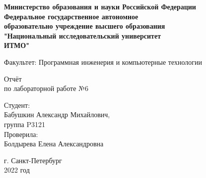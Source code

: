 \begin{titlepage}
    \newpage
    \begin{center}
    {\bfseries \large Министерство образования и науки Российской Федерации \\
    Федеральное государственное автономное\\
    образовательно учреждение высшего образования\\
    "Национальный исследовательский университет\\ 
    ИТМО"{}}
    \vspace{1cm}
    
     
    
    

    
    Факультет: Программная инженерия и компьютерные технологии\\
    \vspace{6em}




     Отчёт\\
     по лабораторной работе №6

    \end{center}

    \vspace{1.2em}

    

    \vspace{5em}

    
    \vspace{16em}

    

    \begin{flushright}
                       Студент:\\
                       Бабушкин Александр Михайлович,\\
                       группа P3121\\
                       Проверила:\\
                       Болдырева Елена Александровна\\
                       
    \end{flushright}


    \vspace{3em}

    \begin{center}
    

    г. Санкт-Петербург\\
    2022 год
    \end{center}
\clearpage
\end{titlepage}
